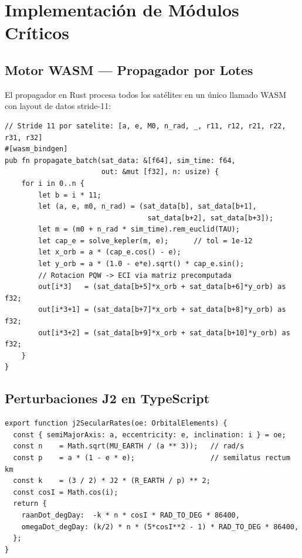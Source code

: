 \documentclass[12pt,a4paper]{article}
\begin{document}
\section{Implementaci\'on de M\'odulos Cr\'iticos}

\subsection{Motor WASM --- Propagador por Lotes}

El propagador en Rust procesa todos los sat\'elites en un \'unico llamado WASM con layout de datos stride-11:

\begin{lstlisting}[style=tsStyle, caption={Propagador WASM por lotes (wasm-physics/src/kepler.rs)}]
// Stride 11 por satelite: [a, e, M0, n_rad, _, r11, r12, r21, r22, r31, r32]
#[wasm_bindgen]
pub fn propagate_batch(sat_data: &[f64], sim_time: f64,
                       out: &mut [f32], n: usize) {
    for i in 0..n {
        let b = i * 11;
        let (a, e, m0, n_rad) = (sat_data[b], sat_data[b+1],
                                  sat_data[b+2], sat_data[b+3]);
        let m = (m0 + n_rad * sim_time).rem_euclid(TAU);
        let cap_e = solve_kepler(m, e);      // tol = 1e-12
        let x_orb = a * (cap_e.cos() - e);
        let y_orb = a * (1.0 - e*e).sqrt() * cap_e.sin();
        // Rotacion PQW -> ECI via matriz precomputada
        out[i*3]   = (sat_data[b+5]*x_orb + sat_data[b+6]*y_orb) as f32;
        out[i*3+1] = (sat_data[b+7]*x_orb + sat_data[b+8]*y_orb) as f32;
        out[i*3+2] = (sat_data[b+9]*x_orb + sat_data[b+10]*y_orb) as f32;
    }
}
\end{lstlisting}

\subsection{Perturbaciones J2 en TypeScript}

\begin{lstlisting}[caption={Tasas seculares J2 (Perturbations.ts)}]
export function j2SecularRates(oe: OrbitalElements) {
  const { semiMajorAxis: a, eccentricity: e, inclination: i } = oe;
  const n    = Math.sqrt(MU_EARTH / (a ** 3));   // rad/s
  const p    = a * (1 - e * e);                  // semilatus rectum km
  const k    = (3 / 2) * J2 * (R_EARTH / p) ** 2;
  const cosI = Math.cos(i);
  return {
    raanDot_degDay:  -k * n * cosI * RAD_TO_DEG * 86400,
    omegaDot_degDay: (k/2) * n * (5*cosI**2 - 1) * RAD_TO_DEG * 86400,
  };
}
\end{lstlisting}
\end{document}
